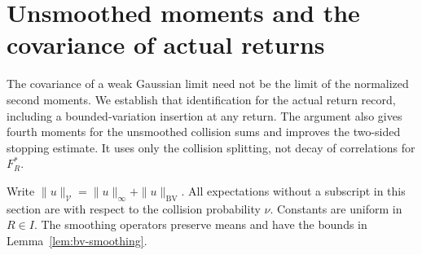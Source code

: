 \section{Unsmoothed moments and the covariance of actual returns}
\label{sec:unsmoothed-moments}
The covariance of a weak Gaussian limit need not be the limit of the
normalized second moments. We establish that identification for the
actual return record, including a bounded-variation insertion at any
return. The argument also gives fourth moments for the unsmoothed
collision sums and improves the two-sided stopping estimate. It uses
only the collision splitting, not decay of correlations for $F_R^*$.

Write $\|u\|_{\mathcal V}=\|u\|_\infty+\|u\|_{\mathrm{BV}}$.
All expectations without a subscript in this section are with respect
to the collision probability $\nu$. Constants are uniform in $R\in I$.
The smoothing operators preserve means and have the bounds in
Lemma~\ref{lem:bv-smoothing}.

